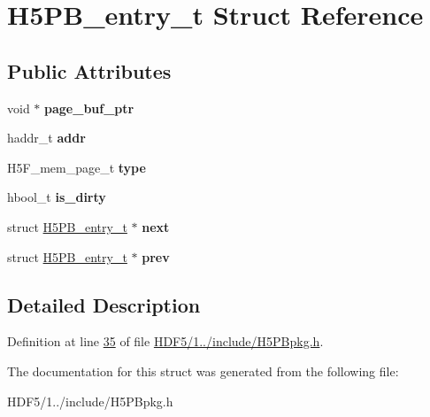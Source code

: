 \hypertarget{struct_h5_p_b__entry__t}{}\section{H5\+P\+B\+\_\+entry\+\_\+t Struct Reference}
\label{struct_h5_p_b__entry__t}
\subsection*{Public Attributes}
\begin{DoxyCompactItemize}
\item 
\mbox{\label{struct_h5_p_b__entry__t_a67427282b632225c5d3b9d3266797fb3}} 
void $\ast$ {\bfseries page\+\_\+buf\+\_\+ptr}
\item 
\mbox{\label{struct_h5_p_b__entry__t_a37e4c0cba0cc25ebad4be201b21a3105}} 
haddr\+\_\+t {\bfseries addr}
\item 
\mbox{\label{struct_h5_p_b__entry__t_a2c1f14633718e768fc400ba27d2d00ce}} 
H5\+F\+\_\+mem\+\_\+page\+\_\+t {\bfseries type}
\item 
\mbox{\label{struct_h5_p_b__entry__t_a5db50eb77bacc6b12b761c3050afe115}} 
hbool\+\_\+t {\bfseries is\+\_\+dirty}
\item 
\mbox{\label{struct_h5_p_b__entry__t_acd6388eb2723d3448fe19d80c0bf7983}} 
struct \hyperlink{struct_h5_p_b__entry__t}{H5\+P\+B\+\_\+entry\+\_\+t} $\ast$ {\bfseries next}
\item 
\mbox{\label{struct_h5_p_b__entry__t_a4041a95ad6d3117bbe50068e05558574}} 
struct \hyperlink{struct_h5_p_b__entry__t}{H5\+P\+B\+\_\+entry\+\_\+t} $\ast$ {\bfseries prev}
\end{DoxyCompactItemize}


\subsection{Detailed Description}


Definition at line \hyperlink{_h_d_f5_21_810_81_2include_2_h5_p_bpkg_8h_source_l00035}{35} of file \hyperlink{_h_d_f5_21_810_81_2include_2_h5_p_bpkg_8h_source}{H\+D\+F5/1../include/\+H5\+P\+Bpkg.\+h}.



The documentation for this struct was generated from the following file\+:\begin{DoxyCompactItemize}
\item 
H\+D\+F5/1../include/\+H5\+P\+Bpkg.\+h\end{DoxyCompactItemize}
